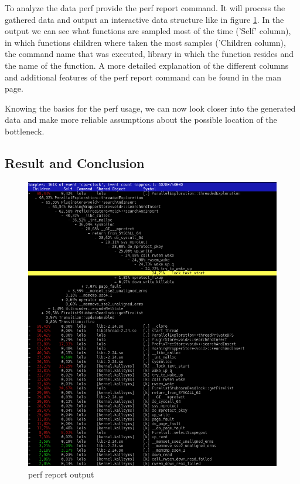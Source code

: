 To analyze the data perf provide the perf report command. It will process the gathered data and output an interactive data structure like in figure \ref{perf_record_sample}. In the output we can see what functions are sampled most of the time ('Self' column), in which functions children where taken the most samples ('Children column), the command name that was executed, library in which the function resides and the name of the function. A more detailed explanation of the different columns and additional features of the perf report command can be found in the man page.

Knowing the basics for the perf usage, we can now look closer into the generated data and make more reliable assumptions about the possible location of the bottleneck.

\subsection{Result and Conclusion}
\label{first_perf_results}
\begin{figure}
    \centering
    \includegraphics[width=\textwidth]{pictures/perfReportSample.png}
    \caption{perf report output}
    \label{perf_record_sample}
\end{figure}
